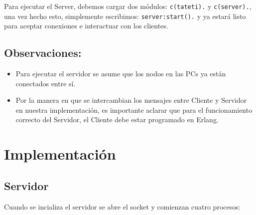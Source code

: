 \documentclass[11pt]{article}
\begin{document}
Para ejecutar el Server, debemos cargar dos módulos: \texttt{c(tateti).} y \texttt{c(server).}, una
vez hecho esto, simplemente escribimos: \texttt{server:start().} y ya estará listo
para aceptar conexiones e interactuar con los clientes. \\

\subsection*{Observaciones:}

\begin{itemize}
    \item Para ejecutar el servidor se asume que los nodos en las PCs ya están
          conectados entre sí.
    \item Por la manera en que se intercambian los mensajes entre Cliente y Servidor 
          en nuestra implementación, es importante aclarar que para el funcionamiento
          correcto del Servidor, el Cliente debe estar programado en Erlang. 
\end{itemize}

\section*{Implementación}

\subsection*{Servidor}

Cuando se incializa el servidor se abre el socket y comienzan cuatro procesos:
\end{document}
